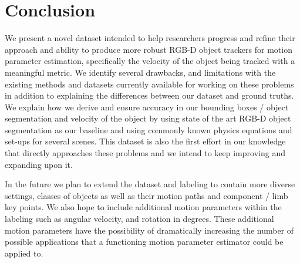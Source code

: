 \section{Conclusion}
We present a novel dataset intended to help researchers progress and refine their approach and ability to produce more robust RGB-D object trackers for motion parameter estimation, specifically the velocity of the object being tracked with a meaningful metric. We identify several drawbacks, and limitations with the existing methods and datasets currently available for working on these problems in addition to explaining the differences between our dataset and ground truths. We explain how we derive and ensure accuracy in our bounding boxes / object segmentation and velocity of the object by using state of the art RGB-D object segmentation as our baseline and using commonly known physics equations and set-ups for several scenes. This dataset is also the first effort in our knowledge that directly approaches these problems and we intend to keep improving and expanding upon it.

In the future we plan to extend the dataset and labeling to contain more diverse settings, classes of objects as well as their motion paths and component / limb key points. We also hope to include additional motion parameters within the labeling such as angular velocity, and rotation in degrees. These additional motion parameters have the possibility of dramatically increasing the number of possible applications that a functioning motion parameter estimator could be applied to.
